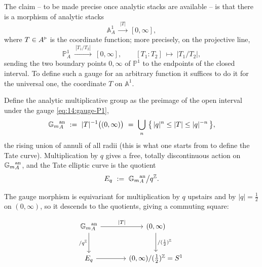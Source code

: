 \begin{remark}
\label{rmk:14:gauge-morphism}
The claim -- to be made precise once analytic stacks are available -- is that there
is a morphism of analytic stacks
\begin{equation}
\label{eq:14:gauge}
\mathbb{A}^1_A\ \xrightarrow{\ |T|\ }\ [0,\infty],
\end{equation}
where $T\in A^{\triangleright}$ is the coordinate function; more precisely, on the projective line,
\begin{equation}
\label{eq:14:gauge-P1}
\mathbb{P}^1_A\ \xrightarrow{\ |T_1/T_2|\ }\ [0,\infty],\qquad [T_1:T_2]\ \longmapsto\ |T_1/T_2|,
\end{equation}
sending the two boundary points $0,\infty$ of $\mathbb{P}^1$ to the endpoints of the
closed interval. To define such a gauge for an arbitrary function it suffices to do it
for the universal one, the coordinate $T$ on $\mathbb{A}^1$.
\end{remark}

\begin{definition}
\label{def:14:tate-construction}
Define the analytic multiplicative group as the preimage of the open interval under
the gauge \eqref{eq:14:gauge-P1},
\begin{equation*}
{\Gm}^{\mathrm{an}}_{A}\ :=\ |T|^{-1}\bigl((0,\infty)\bigr)\ =\ \bigcup_{n}\ \bigl\{\,|q|^{n}\le |T|\le |q|^{-n}\,\bigr\},
\end{equation*}
the rising union of annuli of all radii (this is what one starts from to define the
Tate curve). Multiplication by $q$ gives a free, totally discontinuous action on
${\mathbb{G}_{m}}^{\mathrm{an}}_{A}$, and the Tate elliptic curve is the quotient
\begin{equation*}
E_q\ :=\ {\Gm}^{\mathrm{an}}_{A}\big/q^{\mathbb{Z}}.
\end{equation*}
\end{definition}

The gauge morphism is equivariant for multiplication by $q$ upstairs and by
$|q|=\tfrac12$ on $(0,\infty)$, so it descends to the quotients, giving a commuting
square:

\[
\begin{tikzcd}[column sep=large, row sep=large]
{\Gm}^{\mathrm{an}}_{A} \arrow[r, "|T|"] \arrow[d, "/q^{\mathbb{Z}}"'] & (0,\infty) \arrow[d, "/(\frac12)^{\mathbb{Z}}"] \\
E_q \arrow[r] & (0,\infty)/(\tfrac12)^{\mathbb{Z}}=S^1
\end{tikzcd}
\]


